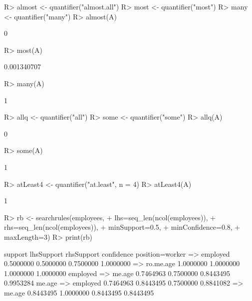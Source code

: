 \documentclass{article}\usepackage[]{graphicx}\usepackage[]{color}
\begin{document}
\begin{Schunk}
% --begin: "quant5"
\begin{Sinput}
R> almost <- quantifier("almost.all")
R> most <- quantifier("most")
R> many <- quantifier("many")
R> almost(A)
\end{Sinput}
\begin{Soutput}
[1] 0
\end{Soutput}
\begin{Sinput}
R> most(A)
\end{Sinput}
\begin{Soutput}
[1] 0.001340707
\end{Soutput}
\begin{Sinput}
R> many(A)
\end{Sinput}
\begin{Soutput}
[1] 1
\end{Soutput}
%
% --end: "quant5"
\end{Schunk}

\begin{Schunk}
% --begin: "quant6"
\begin{Sinput}
R> allq <- quantifier("all")
R> some <- quantifier("some")
R> allq(A)
\end{Sinput}
\begin{Soutput}
[1] 0
\end{Soutput}
\begin{Sinput}
R> some(A)
\end{Sinput}
\begin{Soutput}
[1] 1
\end{Soutput}
%
% --end: "quant6"
\end{Schunk}

\begin{Schunk}
% --begin: "quant7"
\begin{Sinput}
R> atLeast4 <- quantifier("at.least", n = 4)
R> atLeast4(A)
\end{Sinput}
\begin{Soutput}
[1] 1
\end{Soutput}
%
% --end: "quant7"
\end{Schunk}

\begin{Schunk}
% --begin: "searchrules"
\begin{Sinput}
R> rb <- searchrules(employees,
+                    lhs=seq_len(ncol(employees)),
+                    rhs=seq_len(ncol(employees)),
+                    minSupport=0.5,
+                    minConfidence=0.8,
+                    maxLength=3)
R> print(rb)
\end{Sinput}
\begin{Soutput}
                              support lhsSupport rhsSupport confidence
position=worker => employed 0.5000000  0.5000000  0.7500000  1.0000000
 => ro.me.age               1.0000000  1.0000000  1.0000000  1.0000000
employed => me.age          0.7464963  0.7500000  0.8443495  0.9953284
me.age => employed          0.7464963  0.8443495  0.7500000  0.8841082
 => me.age                  0.8443495  1.0000000  0.8443495  0.8443495
\end{Soutput}
%
% --end: "searchrules"
\end{Schunk}
\end{document}

